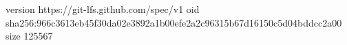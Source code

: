 version https://git-lfs.github.com/spec/v1
oid sha256:966c3613eb45f30da02e3892a1b00efe2a2c96315b67d16150c5d04bddcc2a00
size 125567
